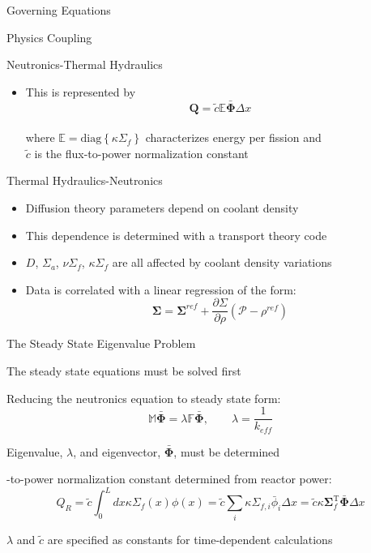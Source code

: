 \documentclass{beamer}
\begin{document}
\begin{section}{Governing Equations}
\begin{frame}{Physics Coupling}
\begin{block}{Neutronics-Thermal Hydraulics}
\begin{itemize}
    \item This is represented by
    \[
      \mathbf{Q}=\tilde{c}\mathbb{E}\bar{\mathbf{\Phi}}\Delta x
    \]
    \\where $\mathbb{E}=\mathrm{diag}\left\{\kappa\Sigma_{f}\right\}$ characterizes energy per fission and \\  $\tilde{c}$ is the flux-to-power normalization constant
  \end{itemize}
\end{block}
\begin{alertblock}{Thermal Hydraulics-Neutronics}
  \begin{itemize}
    \item Diffusion theory parameters depend on coolant density
    \item This dependence is determined with a transport theory code
    \item $D$, $\Sigma_{a}$, $\nu\Sigma_{f}$, $\kappa\Sigma_{f}$ are all affected by coolant density variations
    \item Data is correlated with a linear regression of the form:
    \[
     \mathbf{\Sigma} = \mathbf{\Sigma}^{ref} + \frac{\partial\Sigma}{\partial\rho}\left(\mathcal{P} - \rho^{ref}\right)
    \]
  \end{itemize}
\end{alertblock}
\end{frame}
\begin{frame}{The Steady State Eigenvalue Problem}
\begin{customlist}{2ex}{0pt}
  \item The steady state equations must be solved first
  \vfill\item Reducing the neutronics equation to steady state form:
  \[
    \mathbb{M}\bar{\mathbf{\Phi}}=\lambda\mathbb{F}\bar{\mathbf{\Phi}},\qquad \lambda = \frac{1}{k_{eff}}
  \]
  \vfill\item Eigenvalue, $\lambda$, and eigenvector, $\bar{\mathbf{\Phi}}$, must be determined
  \vfill\item -to-power normalization constant determined from reactor power:
  \[
    Q_{R}=\tilde{c}\int_{0}^{L}dx\kappa\Sigma_{f}\left(x\right)\phi\left(x\right)=\tilde{c}\sum_{i}\kappa\Sigma_{f,i}\bar{\phi}_{i}\Delta x=\tilde{c}\kappa\mathbf{\Sigma}_{f}^{\mathrm{T}}\bar{\mathbf{\Phi}}\Delta x
  \]
  \item $\lambda$ and $\tilde{c}$ are specified as constants for time-dependent calculations 
  \vspace{0.5cm}
\end{customlist}
\end{frame}
\end{section}
\end{document}
